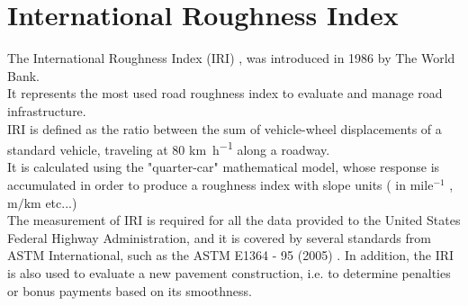 \documentclass[tesi]{subfiles}
\begin{document}
	\chapter{International Roughness Index}
\label{ch:IRI}
The International Roughness Index (IRI) \cite{sayers1986guidelines}, was introduced in 1986 by The World Bank.\cite{sayers1986guidelines}\cite{sayers1986international}\\It represents the most used road roughness index to evaluate and manage road infrastructure. \\IRI is defined as the ratio between the sum of vehicle-wheel displacements of a standard vehicle, traveling at \num{80} \si{\km\per\hour} along a roadway\cite{sayers1995calculation}. \\It is calculated using the "quarter-car" mathematical model, whose response is accumulated in order to produce a roughness index with slope units ( in  mile$^{-1}$ , $\si{\meter\per\km}$  etc...) \cite{little_book}\\
The measurement of IRI is required for all the data provided to the United States Federal Highway Administration, and it is covered by several standards from ASTM International, such as the ASTM E1364 - 95 (2005) \cite{astm2}. In addition, the IRI is also used to evaluate a new pavement construction, i.e. to determine penalties or bonus payments based on its smoothness.
\end{document}
